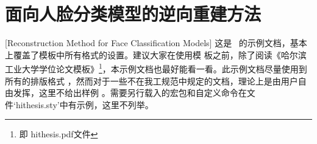 
\chapter[面向人脸分类模型的逆向重建方法]{面向人脸分类模型的逆向重建方法}[Reconstruction Method for Face Classification Models]
这是 \hithesis\ 的示例文档，基本上覆盖了模板中所有格式的设置。建议大家在使用模
板之前，除了阅读《\hithesis\:哈尔滨工业大学学位论文模板》\footnote{即
hithesis.pdf文件}，本示例文档也最好能看一看。此示例文档尽量使用到所有的排版格式
，然而对于一些不在我工规范中规定的文档，理论上是由用户自由发挥，这里不给出样例
。需要另行载入的宏包和自定义命令在文件`hithesis.sty'中有示例，这里不列举。
